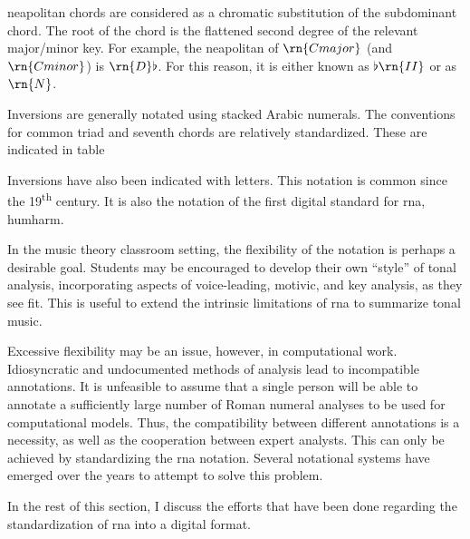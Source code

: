 
\gls{neapolitan} chords are considered as a chromatic
substitution of the subdominant chord. The root of the chord
is the flattened second degree of the relevant major/minor
key. For example, the \gls{neapolitan} of $\rn{C major}$
(and $\rn{C minor}$) is $\rn{D}\flat$. For this reason, it
is either known as $\flat\rn{II}$ or as $\rn{N}$.

Inversions are generally notated using stacked Arabic
numerals. The conventions for common triad and seventh
chords are relatively standardized. These are indicated in
table 


Inversions have also been indicated with letters. This
notation is common since the 19\textsuperscript{th} century.
It is also the notation of the first digital standard for
\gls{rna}, \gls{humharm}.

In the music theory classroom setting, the flexibility of
the notation is perhaps a desirable goal. Students may be
encouraged to develop their own ``style'' of tonal analysis,
incorporating aspects of voice-leading, motivic, and key
analysis, as they see fit. This is useful to extend the
intrinsic limitations of \gls{rna} to summarize tonal music.

Excessive flexibility may be an issue, however, in
computational work. Idiosyncratic and undocumented methods
of analysis lead to incompatible annotations. It is
unfeasible to assume that a single person will be able to
annotate a sufficiently large number of Roman numeral
analyses to be used for computational models. Thus, the
compatibility between different annotations is a necessity,
as well as the cooperation between expert analysts. This can
only be achieved by standardizing the \gls{rna} notation.
Several notational systems have emerged over the years to
attempt to solve this problem.

In the rest of this section, I discuss the efforts that have
been done regarding the standardization of \gls{rna} into a
digital format.
